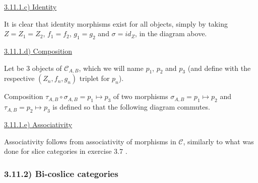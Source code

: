 \documentclass[12pt, letterpaper, twoside]{report}
\begin{document}
\vspace{5mm}
\underline{3.11.1.c) Identity}

It is clear that identity morphisms exist for all objects, simply by taking $Z = Z_1 = Z_2$, $f_1 = f_2$, $g_1 = g_2$ and $\sigma = id_Z$, in the diagram above.


\vspace{5mm}
\underline{3.11.1.d) Composition}

Let be 3 objects of $\mathcal{C}_{A,B}$, which we will name $p_1$, $p_2$ and $p_3$ (and define with the respective $(Z_n, f_n, g_n)$ triplet for $p_n$).

Composition $\tau_{A, B} \circ \sigma_{A, B} = p_1 \mapsto p_3$ of two morphisms $\sigma_{A, B} = p_1 \mapsto p_2$ and $\tau_{A, B} = p_2 \mapsto p_3$ is defined so that the following diagram commutes.



\vspace{5mm}
\underline{3.11.1.e) Associativity}

Associativity follows from associativity of morphisms in $\mathcal{C}$, similarly to what was done for slice categories in exercise 3.7 .



\subsubsection*{3.11.2) Bi-coslice categories}
\end{document}
